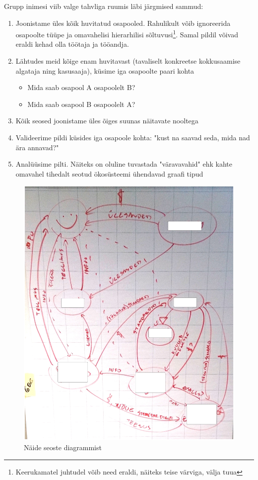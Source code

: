 \documentclass{tufte-book}
\begin{document}
Grupp inimesi viib valge tahvliga ruumis läbi järgmised sammud:
\begin{enumerate}
	\item Joonistame üles kõik huvitatud osapooled. Rahulikult võib ignoreerida osapoolte tüüpe ja omavahelisi hierarhilisi sõltuvusi\footnote{Keerukamatel juhtudel võib need eraldi, näiteks teise värviga, välja tuua}. Samal pildil võivad eraldi kehad olla töötaja ja tööandja. 
	\item Lähtudes meid kõige enam huvitavast (tavaliselt konkreetse kokkusaamise algataja ning kasusaaja), küsime iga osapoolte paari kohta
		\begin{itemize}
			\item Mida saab osapool A osapoolelt B?
			\item Mida saab osapool B osapoolelt A?
		\end{itemize}
	\item Kõik seosed joonistame üles õiges suunas näitavate nooltega 
	\item Valideerime pildi küsides iga osapoole kohta: "kust na saavad seda, mida nad ära annavad?"
	\item Analüüsime pilti. Näiteks on oluline tuvastada "väravavahid" ehk kahte omavahel tihedalt seotud ökosüsteemi ühendavad graafi tipud
\end{enumerate}

\begin{figure}[h]
	\begin{center}
		\includegraphics[width=.6\textwidth]{seosed.jpg}
		\caption{Näide seoste diagrammist}
		\label{fig:seosed}
	\end{center}
\end{figure}
\end{document}
